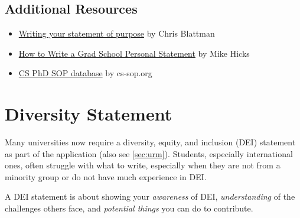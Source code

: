 \documentclass[oneside,11pt,dvipsnames]{book}
\begin{document}
\subsection*{Additional Resources}
\begin{itemize}
    \item \href{https://chrisblattman.com/blog/2022/01/11/}{Writing your statement of purpose} by Chris Blattman
  \item \href{http://www.pl-enthusiast.net/2022/10/03/how-to-write-a-grad-school-personal-statement/}{How to Write a Grad School Personal Statement} by Mike Hicks
  \item     \href{https://cs-sop.notion.site/cs-sop/CS-PhD-Statements-of-Purpose-df39955313834889b7ac5411c37b958d?p=f5d5980a71524ebaa4e6ae57266b847c&pm=s}{CS PhD SOP database} by cs-sop.org
\end{itemize}


\section{Diversity Statement}\label{sec:diversity-statement}


Many universities now require a diversity, equity, and inclusion (DEI) statement as part of the application (also see \autoref{sec:urm}). Students, especially international ones, often struggle with what to write, especially when they are not from a minority group or do not have much experience in DEI.

A DEI statement is about showing your \emph{awareness} of DEI, \emph{understanding} of the challenges others face, and \emph{potential things} you can do to contribute. 
\end{document}
